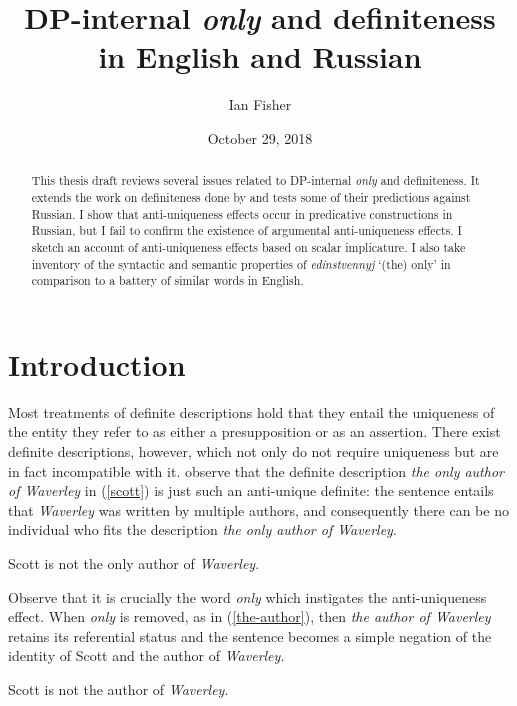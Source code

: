 \documentclass{article}
\title{DP-internal \textit{only} and definiteness in English and Russian}
\author{Ian Fisher}
\date{October 29, 2018}
\begin{document}
\maketitle


\begin{abstract}
This thesis draft reviews several issues related to DP-internal \textit{only} and definiteness. It extends the work on definiteness done by \citet{cb2015, cb2012a, cb2012b} and tests some of their predictions against Russian. I show that anti-uniqueness effects occur in predicative constructions in Russian, but I fail to confirm the existence of argumental anti-uniqueness effects. I sketch an account of anti-uniqueness effects based on scalar implicature. I also take inventory of the syntactic and semantic properties of \textit{edinstvennyj} `(the) only' in comparison to a battery of similar words in English.
\end{abstract}


\section{Introduction}
Most treatments of definite descriptions hold that they entail the uniqueness of the entity they refer to as either a presupposition or as an assertion. There exist definite descriptions, however, which not only do not require uniqueness but are in fact incompatible with it. \citet{cb2015} observe that the definite description \textit{the only author of Waverley} in (\ref{scott}) is just such an anti-unique definite: the sentence entails that \textit{Waverley} was written by multiple authors, and consequently there can be no individual who fits the description \textit{the only author of Waverley}.

\begin{exe}
	\ex \label{scott} Scott is not the only author of \textit{Waverley}.
\end{exe}

Observe that it is crucially the word \textit{only} which instigates the anti-uniqueness effect. When \textit{only} is removed, as in (\ref{the-author}), then \textit{the author of Waverley} retains its referential status and the sentence becomes a simple negation of the identity of Scott and the author of \textit{Waverley}.

\begin{exe}
	\ex \label{the-author} Scott is not the author of \textit{Waverley}.
\end{exe}
\end{document}
